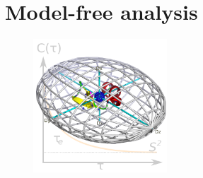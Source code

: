 


\chapter{Model-free analysis}
\label{ch: model-free}


\begin{figure}[h]
  \includegraphics[width=5cm, bb=0 0 1701 1701]{graphics/analyses/model_free/model_free_600x600}
\end{figure}


